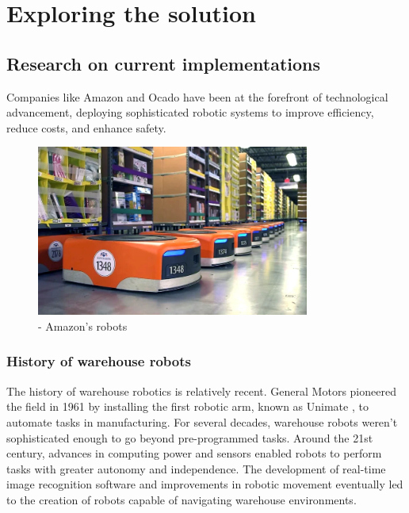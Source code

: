 
\chapter{Exploring the solution}

\section{Research on current implementations}

Companies like Amazon and Ocado have been at the forefront of technological advancement, deploying sophisticated robotic systems to improve efficiency, reduce costs, and enhance safety.

\begin{figure}[h!] 
\centering    
\includegraphics[width=0.8\textwidth]{Images/kiva.png}
\caption{- Amazon's robots \cite{amazonrobotics_2024_closeup}}
\label{robot}
\end{figure}

\subsection{History of warehouse robots}

The history of warehouse robotics is relatively recent. General Motors pioneered the field in 1961 by installing the first robotic arm, known as Unimate \cite{a2024_joseph}, to automate tasks in manufacturing. For several decades, warehouse robots weren't sophisticated enough to go beyond pre-programmed tasks. Around the 21st century, advances in computing power and sensors enabled robots to perform tasks with greater autonomy and independence. The development of real-time image recognition software and improvements in robotic movement eventually led to the creation of robots capable of navigating warehouse environments.

